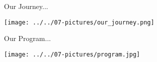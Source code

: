 \documentclass[11pt]{beamer}
\begin{document}
\begin{frame}{Our Journey...}
\begin{center}
\texttt{[image: ../../07-pictures/our\_journey.png]} 
\end{center}
\end{frame}
\begin{frame}{Our Program...}
\begin{center}
\texttt{[image: ../../07-pictures/program.jpg]} 
\end{center}
\end{frame}
\end{document}
